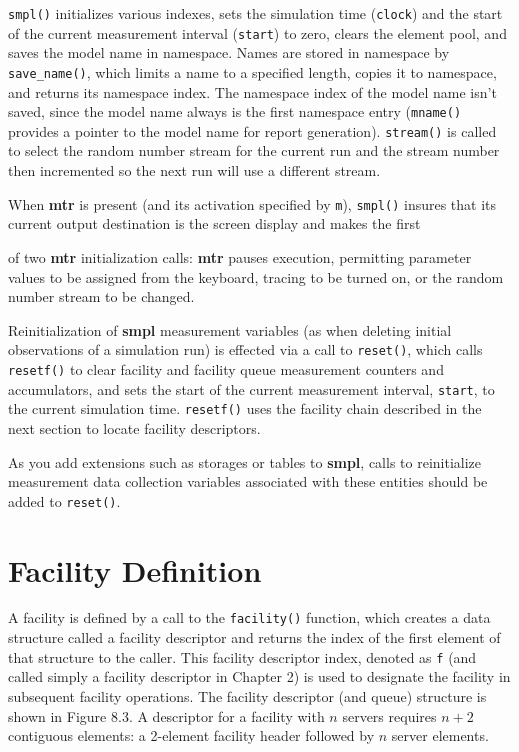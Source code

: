 \texttt{smpl()} initializes various indexes, sets the simulation time (\texttt{clock})
and the start of the current measurement interval (\texttt{start}) to zero, clears the
element pool, and saves the model name in namespace. Names are stored in
namespace by \texttt{save\_name()}, which limits a name to a specified length,
copies it to namespace, and returns its namespace index. The namespace
index of the model name isn't saved, since the model name always is the first
namespace entry (\texttt{mname()} provides a pointer to the model name for report
generation). \texttt{stream()} is called to select the random number stream for the
current run and the stream number then incremented so the next run will use a
different stream.

When \textbf{mtr} is present (and its activation specified by \texttt{m}), \texttt{smpl()} insures
that its current output destination is the screen display and makes the first

\noindent of two \textbf{mtr} initialization calls: \textbf{mtr} pauses execution, permitting parameter
values to be assigned from the keyboard, tracing to be turned on, or the
random number stream to be changed.

Reinitialization of \textbf{smpl} measurement variables (as when deleting initial
observations of a simulation run) is effected via a call to \texttt{reset()},
which calls \texttt{resetf()} to clear facility and facility queue measurement
counters and accumulators, and sets the start of the current measurement
interval, \texttt{start}, to the current simulation time. \texttt{resetf()} uses the facility
chain described in the next section to locate facility descriptors.

As you add extensions such as storages or tables to \textbf{smpl}, calls to
reinitialize measurement data collection variables associated with these
entities should be added to \texttt{reset()}.

\section{Facility Definition}

A facility is defined by a call to the \texttt{facility()} function, which
creates a data structure called a facility descriptor and returns the index of
the first element of that structure to the caller. This facility descriptor
index, denoted as \texttt{f} (and called simply a facility descriptor in Chapter 2) is
used to designate the facility in subsequent facility operations. The facility
descriptor (and queue) structure is shown in Figure 8.3. A descriptor for a
facility with $n$ servers requires $n+2$ contiguous elements: a 2-element facility
header followed by $n$ server elements.

